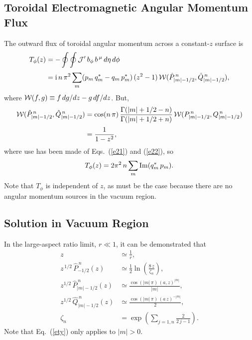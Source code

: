 \documentclass[12pt,prb,aps]{revtex4-1}
\begin{document}
\subsection{Toroidal Electromagnetic Angular Momentum Flux}
The outward flux of toroidal angular momentum across a constant-$z$ surface is
\begin{align}
T_\phi(z) &= -\oint\oint {\cal J}' \,b_\phi\,b^{\,\mu}\,d\eta\,d\phi\\[0.5ex]
&={\rm i}\,n\,\pi^2\sum_{m}(p_m\,q_m^\ast-q_m\,p_m^{\ast})\,(z^2-1)\,{\cal W}(\hat{P}_{|m|-1/2}^{\,n},\hat{Q}_{|m|-1/2}^{\,n}),
\end{align}
where ${\cal W}(f,g)\equiv f\,dg/dz-g\,df/dz$. 
But,\cite{morse}
\begin{align}
{\cal W}(\hat{P}_{|m|-1/2}^{\,n},\hat{Q}_{|m|-1/2}^{\,n})&= 
\cos(n\,\pi) \,\frac{\Gamma(|m|+1/2-n)}{\Gamma(|m|+1/2+n)}\,{\cal W}(P_{|m|-1/2}^{\,n},Q_{|m|-1/2}^{\,n})\nonumber\\[0.5ex]
&= \frac{1}{1-z^2}, 
\end{align}
where use has been made of Eqs.~(\ref{e21}) and (\ref{e22}), 
so
\begin{equation}\label{e30x}
T_\phi(z) = 2\pi^2\,n\sum_m {\rm Im}(q_m^\ast\,p_m).
\end{equation}
Note that $T_\phi$ is independent of $z$, as must be the case because there are no angular momentum sources in the vacuum region.

\subsection{Solution in Vacuum Region}
In the large-aspect ratio limit, $r\ll 1$, it can be demonstrated that\,\cite{morse}
\begin{align}\label{e25t}
z&\simeq \frac{1}{r},\\[0.5ex]
z^{\,1/2}\,\hat{P}^{\,n}_{-1/2}(z) &\simeq \frac{1}{2}\ln\left(\frac{8\,z}{\zeta_n}\right),\\[0.5ex]
z^{1/2}\,\hat{P}^{\,n}_{|m|-1/2}(z) &\simeq \frac{\cos(|m|\,\pi)\,(a,z)^{|m|}}{|m|},\label{ety}\\[0.5ex]
z^{1/2}\,\hat{Q}^{\,n}_{|m|-1/2}(z) &\simeq \frac{\cos(|m|\,\pi)\,(a\,z)^{-|m|}}{2},\\[0.5ex]
\zeta_n &= \exp\left(\sum_{j=1,n}\frac{2}{2\,j-1}\right).\label{e29t}
\end{align}
Note that Eq.~(\ref{ety}) only applies to $|m|>0$. 
\end{document}
